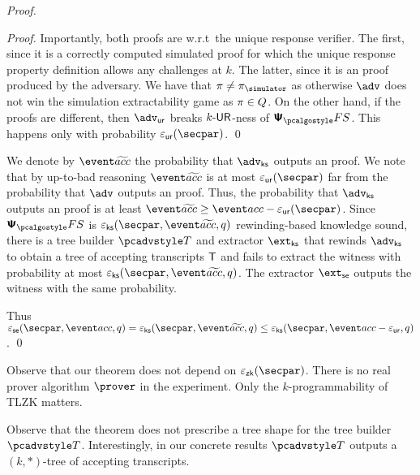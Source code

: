 \begin{proof}
\begin{proof}
	Importantly, both proofs are  w.r.t~the unique response verifier. The first, since it is a correctly computed simulated proof for which the unique response property definition allows any challenges at $k$. The latter, since it is an  proof produced by the adversary.
	We have that $\zkproof \neq \zkproofs$ as otherwise $\advse$ does not win the simulation extractability game as $\pi \in Q$. On the other hand, if the proofs are different, then $\advur$ breaks ${k\text{-}\mathsf{UR}}$-ness of $\psfs$. This happens only with  probability $\epsur(\secpar)$. 
	\qed
	\end{proof}

	We denote by $\waccProb$ the probability that $\advcss$ outputs an  proof. We note that by up-to-bad reasoning $\waccProb$ is at most $\epsur (\secpar)$ far from the probability that $\advse$ outputs an  proof. Thus, the probability that $\advcss$ outputs an  proof is at least $\waccProb \geq \accProb - \epsur (\secpar)$. %
%
	Since $\psfs$ is $\epscss (\secpar, \waccProb,q)$ rewinding-based knowledge sound, there is a tree builder $\tdv$ and extractor $\extcss$ that rewinds $\advcss$ to obtain a tree of accepting transcripts $\mathsf{T}$ and fails to extract the witness with probability at most $\epscss (\secpar, \waccProb, q)$. The extractor $\extse$ outputs the witness with the same probability.

%
	Thus $\epsse(\secpar,\accProb,q) = \epscss (\secpar, \waccProb,q) \leq \epscss(\secpar,\accProb - \epsur,q)$.
	\qed
	\end{proof}

\begin{remark}
Observe that our theorem does not depend on $\epszk(\secpar)$. There is no real prover algorithm $\prover$ in the experiment. Only the $k$-programmability of TLZK matters. 
\end{remark}

\begin{remark}
Observe that the theorem does not prescribe a tree shape for the tree builder $\tdv$. Interestingly, in our concrete results $\tdv$ outputs a $(k, *)$-tree of accepting transcripts.
\end{remark}


